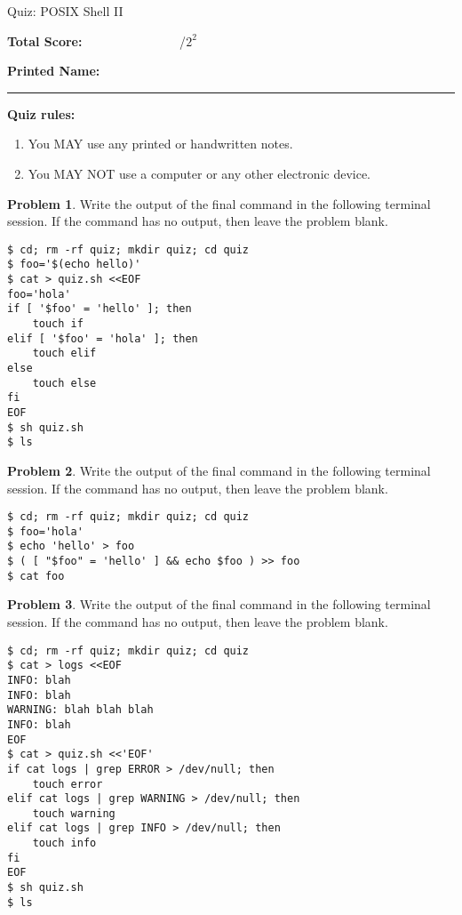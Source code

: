 \documentclass[10pt]{article}
\theoremstyle{definition}
\newtheorem{problem}{Problem}
\begin{document}
\begin{center}
{
\Large
Quiz: POSIX Shell II
}

\vspace{0.1in}
\end{center}

\vspace{0.15in}
\noindent
\textbf{Total Score:} ~~~~~~~~~~~~~~~/$2^2$

\vspace{0.2in}
\noindent
\textbf{Printed Name:}

\noindent
\rule{\textwidth}{0.1pt}
\vspace{0.15in}

\noindent
\textbf{Quiz rules:}
\begin{enumerate}
\item You MAY use any printed or handwritten notes.
\item You MAY NOT use a computer or any other electronic device.
\end{enumerate}

\noindent

\vspace{0.15in}

\filbreak
\begin{problem}
Write the output of the final command in the following terminal session.
If the command has no output, then leave the problem blank.
\end{problem}
\begin{lstlisting}
$ cd; rm -rf quiz; mkdir quiz; cd quiz
$ foo='$(echo hello)'
$ cat > quiz.sh <<EOF
foo='hola'
if [ '$foo' = 'hello' ]; then
    touch if
elif [ '$foo' = 'hola' ]; then
    touch elif
else
    touch else
fi
EOF
$ sh quiz.sh
$ ls
\end{lstlisting}

\vspace{1in}

\filbreak
\begin{problem}
    Write the output of the final command in the following terminal session.
    If the command has no output, then leave the problem blank.
\end{problem}
\begin{lstlisting}
$ cd; rm -rf quiz; mkdir quiz; cd quiz
$ foo='hola'
$ echo 'hello' > foo
$ ( [ "$foo" = 'hello' ] && echo $foo ) >> foo
$ cat foo
\end{lstlisting}

\filbreak
\begin{problem}
    Write the output of the final command in the following terminal session.
    If the command has no output, then leave the problem blank.
\end{problem}
\begin{lstlisting}
$ cd; rm -rf quiz; mkdir quiz; cd quiz
$ cat > logs <<EOF
INFO: blah
INFO: blah
WARNING: blah blah blah
INFO: blah
EOF
$ cat > quiz.sh <<'EOF'
if cat logs | grep ERROR > /dev/null; then
    touch error
elif cat logs | grep WARNING > /dev/null; then
    touch warning
elif cat logs | grep INFO > /dev/null; then
    touch info
fi
EOF
$ sh quiz.sh
$ ls
\end{lstlisting}
\vspace{1in}
\end{document}
